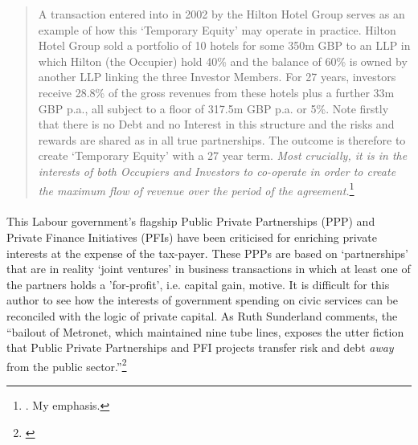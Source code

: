 \documentclass[12pt,a4paper,titlepage]{article}
\begin{document}
\begin{quote}
A transaction entered into in 2002 by the Hilton Hotel Group serves as an example of how this `Temporary Equity' may operate in practice. Hilton Hotel Group sold a portfolio of 10 hotels for some 350m GBP to an LLP in which Hilton (the Occupier) hold 40\% and the balance of 60\% is owned by another LLP linking the three Investor Members. For 27 years, investors receive 28.8\% of the gross revenues from these hotels plus a further 33m GBP p.a.,  all subject to a floor of 317.5m GBP p.a. or 5\%. Note firstly that there is no Debt and no Interest in this structure and the risks and rewards are shared as in all true partnerships. The outcome is therefore to create `Temporary Equity' with a 27 year term. \textit{Most crucially, it is in the interests of both Occupiers and Investors to co-operate in order to create the maximum flow of revenue over the period of the agreement.}\footnote{\cite[p. 10]{cook:2004cp}. My emphasis.}
\end{quote}

\paragraph{}This Labour government's flagship Public Private Partnerships (PPP) and Private Finance Initiatives (PFIs) have been criticised for enriching private interests at the expense of the tax-payer. These PPPs are based on `partnerships' that are in reality `joint ventures' in business transactions in which at least one of the partners holds a 'for-profit', i.e. capital gain, motive. It is difficult for this author to see how the interests of government spending on civic services can be reconciled with the logic of private capital. As Ruth Sunderland comments, the ``bailout of Metronet, which maintained nine tube lines, exposes the utter fiction that Public Private Partnerships and PFI projects transfer risk and debt \textit{away} from the public sector.''\footnote{\cite{Sunderland:2008gn}}
\end{document}
